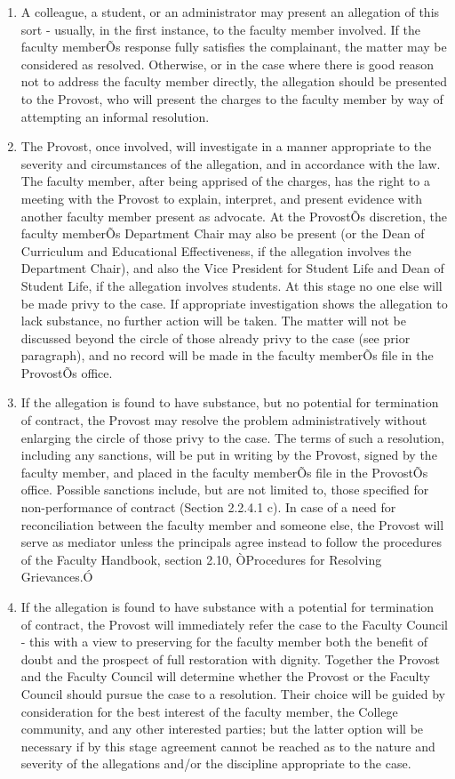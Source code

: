 \documentclass[letterpaper, 11pt]{article}
\begin{document}
				\begin{enumerate}[label=\alph*)]
					\item{A colleague, a student, or an administrator may present an allegation of this sort - usually, in the first instance, to the faculty member involved.  If the faculty memberÕs response fully satisfies the complainant, the matter may be considered as resolved.  Otherwise, or in the case where there is good reason not to address the faculty member directly, the allegation should be presented to the Provost, who will present the charges to the faculty member by way of attempting an informal resolution.}
					\item{The Provost, once involved, will investigate in a manner appropriate to the severity and circumstances of the allegation, and in accordance with the law.  The faculty member, after being apprised of the charges, has the right to a meeting with the Provost to explain, interpret, and present evidence with another faculty member present as advocate.  At the ProvostÕs discretion, the faculty memberÕs Department Chair may also be present (or the Dean of Curriculum and Educational Effectiveness, if the allegation involves the Department Chair), and also the Vice President for Student Life and Dean of Student Life, if the allegation involves students.  At this stage no one else will be made privy to the case.}
					If appropriate investigation shows the allegation to lack substance, no further action will be taken.  The matter will not be discussed beyond the circle of those already privy to the case (see prior paragraph), and no record will be made in the faculty memberÕs file in the ProvostÕs office.
					\item{If the allegation is found to have substance, but no potential for termination of contract, the Provost may resolve the problem administratively without enlarging the circle of those privy to the case.  The terms of such a resolution, including any sanctions, will be put in writing by the Provost, signed by the faculty member, and placed in the faculty memberÕs file in the ProvostÕs office.  Possible sanctions include, but are not limited to, those specified for non-performance of contract (Section 2.2.4.1 c).  In case of a need for reconciliation between the faculty member and someone else, the Provost will serve as mediator unless the principals agree instead to follow the procedures of the Faculty Handbook, section 2.10, ÒProcedures for Resolving Grievances.Ó}
					\item{If the allegation is found to have substance with a potential for termination of contract, the Provost will immediately refer the case to the Faculty Council - this with a view to preserving for the faculty member both the benefit of doubt and the prospect of full restoration with dignity.  Together the Provost and the Faculty Council will determine whether the Provost or the Faculty Council should pursue the case to a resolution.  Their choice will be guided by consideration for the best interest of the faculty member, the College community, and any other interested parties; but the latter option will be necessary if by this stage agreement cannot be reached as to the nature and severity of the allegations and/or the discipline appropriate to the case.}

\end{enumerate}
\end{document}
